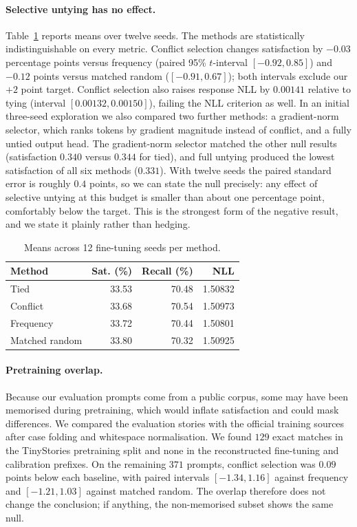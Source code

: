 \documentclass[conference]{IEEEtran}
\begin{document}
\paragraph{Selective untying has no effect.}
Table~\ref{tab:main} reports means over twelve seeds. The methods are
statistically indistinguishable on every metric. Conflict selection changes
satisfaction by $-0.03$ percentage points versus frequency (paired 95\%
$t$-interval $[-0.92,0.85]$) and $-0.12$ points versus matched random
($[-0.91,0.67]$); both intervals exclude our $+2$ point target. Conflict
selection also raises response NLL by $0.00141$ relative to tying (interval
$[0.00132,0.00150]$), failing the NLL criterion as well. In an initial
three-seed exploration we also compared two further methods: a gradient-norm
selector, which ranks tokens by gradient magnitude instead of conflict, and a
fully untied output head. The gradient-norm selector matched the other null
results (satisfaction $0.340$ versus $0.344$ for tied), and full untying
produced the lowest satisfaction of all six methods ($0.331$). With twelve seeds the paired standard error
is roughly $0.4$ points, so we can state the null precisely: any effect of
selective untying at this budget is smaller than about one percentage point,
comfortably below the target. This is the strongest form of the negative result,
and we state it plainly rather than hedging.

\begin{table}[t]
\caption{Means across 12 fine-tuning seeds per method.}
\label{tab:main}
\centering
\small
\begin{tabular}{lrrr}
\toprule
Method & Sat. (\%) & Recall (\%) & NLL \\
\midrule
Tied & 33.53 & 70.48 & 1.50832 \\
Conflict & 33.68 & 70.54 & 1.50973 \\
Frequency & 33.72 & 70.44 & 1.50801 \\
Matched random & 33.80 & 70.32 & 1.50925 \\
\bottomrule
\end{tabular}
\end{table}

\paragraph{Pretraining overlap.}
Because our evaluation prompts come from a public corpus, some may have been
memorised during pretraining, which would inflate satisfaction and could mask
differences. We compared the evaluation stories with the official training
sources after case folding and whitespace normalisation. We found $129$ exact
matches in the TinyStories pretraining split and none in the reconstructed
fine-tuning and calibration prefixes. On the remaining $371$ prompts, conflict
selection was $0.09$ points below each baseline, with paired intervals
$[-1.34,1.16]$ against frequency and $[-1.21,1.03]$ against matched random. The
overlap therefore does not change the conclusion; if anything, the non-memorised
subset shows the same null.
\end{document}
